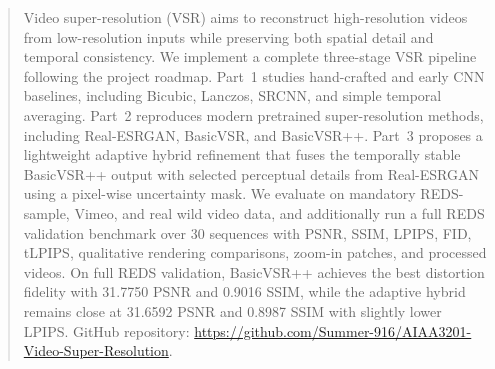 \begin{abstract}
Video super-resolution (VSR) aims to reconstruct high-resolution videos from low-resolution inputs while preserving both spatial detail and temporal consistency. We implement a complete three-stage VSR pipeline following the project roadmap. Part~1 studies hand-crafted and early CNN baselines, including Bicubic, Lanczos, SRCNN, and simple temporal averaging. Part~2 reproduces modern pretrained super-resolution methods, including Real-ESRGAN, BasicVSR, and BasicVSR++. Part~3 proposes a lightweight adaptive hybrid refinement that fuses the temporally stable BasicVSR++ output with selected perceptual details from Real-ESRGAN using a pixel-wise uncertainty mask. We evaluate on mandatory REDS-sample, Vimeo, and real wild video data, and additionally run a full REDS validation benchmark over 30 sequences with PSNR, SSIM, LPIPS, FID, tLPIPS, qualitative rendering comparisons, zoom-in patches, and processed videos. On full REDS validation, BasicVSR++ achieves the best distortion fidelity with 31.7750 PSNR and 0.9016 SSIM, while the adaptive hybrid remains close at 31.6592 PSNR and 0.8987 SSIM with slightly lower LPIPS. GitHub repository: \url{https://github.com/Summer-916/AIAA3201-Video-Super-Resolution}.
\end{abstract}
